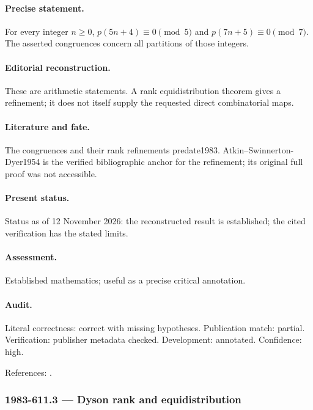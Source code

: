 \paragraph{Precise statement.} For every integer $n\ge0$, $p(5n+4)\equiv0\pmod5$ and $p(7n+5)\equiv0\pmod7$. The asserted congruences concern all partitions of those integers.

\paragraph{Editorial reconstruction.} These are arithmetic statements. A rank equidistribution theorem gives a refinement; it does not itself supply the requested direct combinatorial maps.

\paragraph{Literature and fate.} The congruences and their rank refinements predate1983. Atkin--Swinnerton-Dyer1954 is the verified bibliographic anchor for the refinement; its original full proof was not accessible.

\paragraph{Present status.} Status as of 12 November 2026: the reconstructed result is established; the cited verification has the stated limits.

\paragraph{Assessment.} Established mathematics; useful as a precise critical annotation.

\paragraph{Audit.} Literal correctness: correct with missing hypotheses. Publication match: partial. Verification: publisher metadata checked. Development: annotated. Confidence: high.

\noindent References: \citep{atkinswinnertondyer1954partitions}.\par

\subsubsection{1983-611.3 --- Dyson rank and equidistribution}

